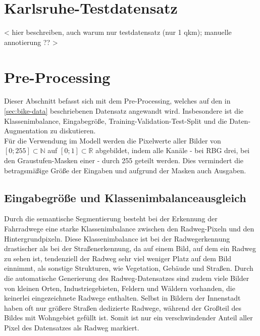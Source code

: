 
\section{Karlsruhe-Testdatensatz}

< hier beschreiben, auch warum nur testdatensatz (nur 1 qkm); manuelle annotierung ?? >

\section{Pre-Processing} \label{sec:pre-processing}

Dieser Abschnitt befasst sich mit dem Pre-Processing, welches auf den in \autoref{sec:bike-data} 
beschriebenen Datensatz angewandt wird. Insbesondere ist die Klassenimbalance, Eingabegröße, 
Training-Validation-Test-Split und die Daten-Augmentation zu diskutieren. \\
Für die Verwendung im Modell werden die Pixelwerte aller Bilder von $[0; 255] \subset \mathbb{N}$
auf $[0;1] \subset \mathbb{R}$ abgebildet, indem alle Kanäle - bei RBG drei, bei den Graustufen-Masken einer - durch 255 geteilt werden.
Dies vermindert die betragsmäßige Größe der Eingaben und aufgrund der Masken auch Ausgaben. 

\subsection{Eingabegröße und Klassenimbalanceausgleich}

Durch die semantische Segmentierung besteht bei der Erkennung der Fahrradwege eine starke 
Klassenimbalance zwischen den Radweg-Pixeln und den Hintergrundpixeln. Diese Klassenimbalance ist bei der Radwegerkennung drastischer 
als bei der Straßenerkennung, da auf einem Bild, auf dem ein Radweg zu sehen ist, 
tendenziell der Radweg sehr viel weniger Platz auf dem Bild einnimmt, als sonstige Strukturen, wie Vegetation, Gebäude und Straßen. 
Durch die automatische Generierung des Radweg-Datensatzes sind zudem viele Bilder von kleinen Orten,
Industriegebieten, Feldern und Wäldern vorhanden, die keinerlei eingezeichnete Radwege enthalten. 
Selbst in Bildern der Innenstadt haben oft nur größere Straßen dedizierte Radwege, während der 
Großteil des Bildes mit Wohngebiet gefüllt ist. 
Somit ist nur ein verschwindender Anteil aller Pixel des Datensatzes als Radweg markiert. 

